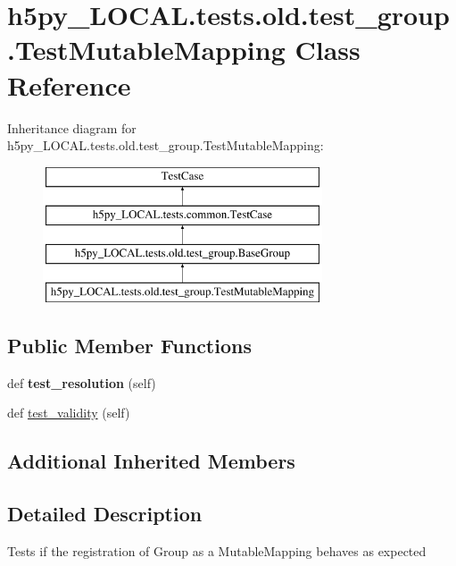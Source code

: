 \hypertarget{classh5py__LOCAL_1_1tests_1_1old_1_1test__group_1_1TestMutableMapping}{}\section{h5py\+\_\+\+L\+O\+C\+A\+L.\+tests.\+old.\+test\+\_\+group.\+Test\+Mutable\+Mapping Class Reference}
\label{classh5py__LOCAL_1_1tests_1_1old_1_1test__group_1_1TestMutableMapping}
Inheritance diagram for h5py\+\_\+\+L\+O\+C\+A\+L.\+tests.\+old.\+test\+\_\+group.\+Test\+Mutable\+Mapping\+:\begin{figure}[H]
\begin{center}
\leavevmode
\includegraphics[height=4.000000cm]{classh5py__LOCAL_1_1tests_1_1old_1_1test__group_1_1TestMutableMapping}
\end{center}
\end{figure}
\subsection*{Public Member Functions}
\begin{DoxyCompactItemize}
\item 
\mbox{\label{classh5py__LOCAL_1_1tests_1_1old_1_1test__group_1_1TestMutableMapping_a2fe354ea2a86a99c83ee7f0e96e6af39}} 
def {\bfseries test\+\_\+resolution} (self)
\item 
def \hyperlink{classh5py__LOCAL_1_1tests_1_1old_1_1test__group_1_1TestMutableMapping_a826e20edb2ce2121e69f57eb0aa9e145}{test\+\_\+validity} (self)
\end{DoxyCompactItemize}
\subsection*{Additional Inherited Members}


\subsection{Detailed Description}
\begin{DoxyVerb}Tests if the registration of Group as a MutableMapping
behaves as expected
\end{DoxyVerb}
 

